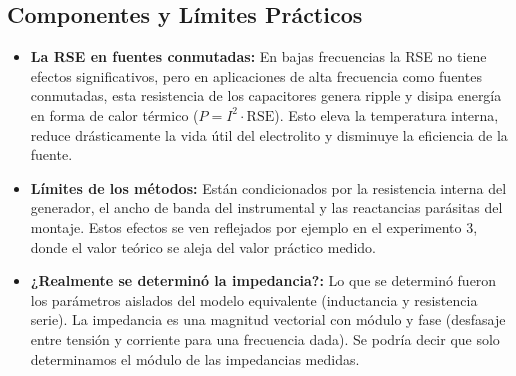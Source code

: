 \subsection{Componentes y Límites Prácticos}

\begin{itemize}
\item \textbf{La RSE en fuentes conmutadas:} En bajas frecuencias la RSE no tiene efectos significativos, pero en aplicaciones de alta frecuencia como fuentes conmutadas, esta resistencia de los capacitores genera ripple y disipa energía en forma de calor térmico ($P = I^2 \cdot \text{RSE}$). Esto eleva la temperatura interna, reduce drásticamente la vida útil del electrolito y disminuye la eficiencia de la fuente.
\item \textbf{Límites de los métodos:} Están condicionados por la resistencia interna del generador, el ancho de banda del instrumental y las reactancias parásitas del montaje. Estos efectos se ven reflejados por ejemplo en el experimento 3, donde el valor teórico se aleja del valor práctico medido.
\item \textbf{¿Realmente se determinó la impedancia?:} Lo que se determinó fueron los parámetros aislados del modelo equivalente (inductancia y resistencia serie). La impedancia es una magnitud vectorial con módulo y fase (desfasaje entre tensión y corriente para una frecuencia dada). Se podría decir que solo determinamos el módulo de las impedancias medidas.
\end{itemize}
